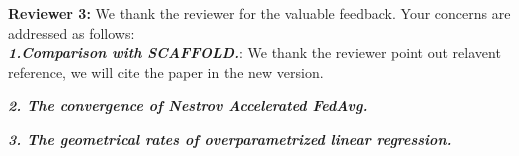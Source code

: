 {\color{blue}\textbf{Reviewer 3:}} We thank the reviewer for the valuable feedback. Your concerns are addressed as follows: \\
\textbf{\textit{1.Comparison with SCAFFOLD.}}: We thank the reviewer point out 
relavent reference, we will cite the paper in the new version. 


\textbf{\textit{2. The convergence of Nestrov Accelerated FedAvg.}}



\textbf{\textit{3. The geometrical rates of overparametrized linear regression.}}